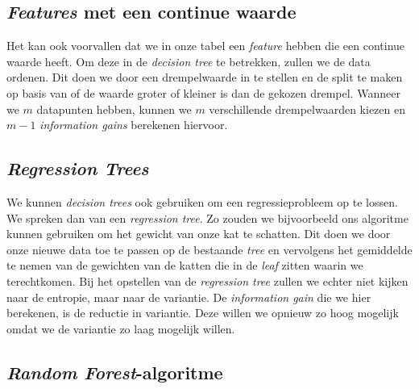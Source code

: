 \subsection{\textit{Features} met een continue waarde}

Het kan ook voorvallen dat we in onze tabel een \textit{feature} hebben die een continue waarde heeft. Om deze in de \textit{decision tree} te betrekken, zullen we de data ordenen. Dit doen we door een drempelwaarde in te stellen en de split te maken op basis van of de waarde groter of kleiner is dan de gekozen drempel. Wanneer we $m$ datapunten hebben, kunnen we $m$ verschillende drempelwaarden kiezen en $m-1$ \textit{information gains} berekenen hiervoor.

\subsection{\textit{Regression Trees}}

We kunnen \textit{decision trees} ook gebruiken om een regressieprobleem op te lossen. We spreken dan van een \textit{regression tree}. Zo zouden we bijvoorbeeld ons algoritme kunnen gebruiken om het gewicht van onze kat te schatten. Dit doen we door onze nieuwe data toe te passen op de bestaande \textit{tree} en vervolgens het gemiddelde te nemen van de gewichten van de katten die in de \textit{leaf} zitten waarin we terechtkomen. Bij het opstellen van de \textit{regression tree} zullen we echter niet kijken naar de entropie, maar naar de variantie. De \textit{information gain} die we hier berekenen, is de reductie in variantie. Deze willen we opnieuw zo hoog mogelijk omdat we de variantie zo laag mogelijk willen. 

\subsection{\textit{Random Forest}-algoritme}

